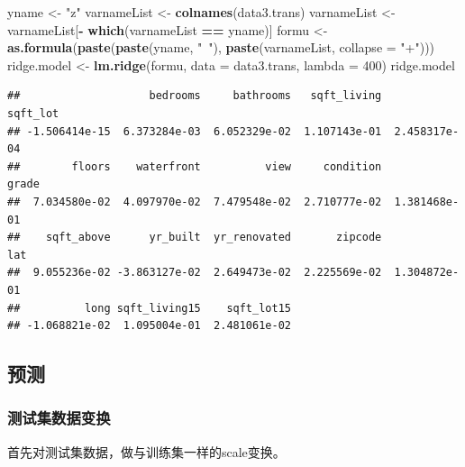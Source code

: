 \documentclass[]{article}
\newenvironment{Shaded}{\begin{snugshade}}{\end{snugshade}}
\newcommand{\KeywordTok}[1]{\textcolor[rgb]{0.13,0.29,0.53}{\textbf{#1}}}
\newcommand{\DataTypeTok}[1]{\textcolor[rgb]{0.13,0.29,0.53}{#1}}
\newcommand{\DecValTok}[1]{\textcolor[rgb]{0.00,0.00,0.81}{#1}}
\newcommand{\StringTok}[1]{\textcolor[rgb]{0.31,0.60,0.02}{#1}}
\newcommand{\OperatorTok}[1]{\textcolor[rgb]{0.81,0.36,0.00}{\textbf{#1}}}
\newcommand{\NormalTok}[1]{#1}
\begin{document}
\begin{Shaded}
\begin{Highlighting}[]
\NormalTok{yname <-}\StringTok{ "z"}
\NormalTok{varnameList <-}\StringTok{ }\KeywordTok{colnames}\NormalTok{(data3.trans)}
\NormalTok{varnameList <-}\StringTok{ }\NormalTok{varnameList[}\OperatorTok{-}\StringTok{ }\KeywordTok{which}\NormalTok{(varnameList }\OperatorTok{==}\StringTok{ }\NormalTok{yname)]}
\NormalTok{formu <-}\StringTok{ }\KeywordTok{as.formula}\NormalTok{(}\KeywordTok{paste}\NormalTok{(}\KeywordTok{paste}\NormalTok{(yname, }\StringTok{"~"}\NormalTok{), }\KeywordTok{paste}\NormalTok{(varnameList, }\DataTypeTok{collapse =} \StringTok{"+"}\NormalTok{)))}
\NormalTok{ridge.model <-}\StringTok{ }\KeywordTok{lm.ridge}\NormalTok{(formu, }\DataTypeTok{data =}\NormalTok{ data3.trans, }
                        \DataTypeTok{lambda =} \DecValTok{400}\NormalTok{)}
\NormalTok{ridge.model}
\end{Highlighting}
\end{Shaded}

\begin{verbatim}
##                    bedrooms     bathrooms   sqft_living      sqft_lot 
## -1.506414e-15  6.373284e-03  6.052329e-02  1.107143e-01  2.458317e-04 
##        floors    waterfront          view     condition         grade 
##  7.034580e-02  4.097970e-02  7.479548e-02  2.710777e-02  1.381468e-01 
##    sqft_above      yr_built  yr_renovated       zipcode           lat 
##  9.055236e-02 -3.863127e-02  2.649473e-02  2.225569e-02  1.304872e-01 
##          long sqft_living15    sqft_lot15 
## -1.068821e-02  1.095004e-01  2.481061e-02
\end{verbatim}









%
\subsection{预测}

\subsubsection{测试集数据变换}

首先对测试集数据，做与训练集一样的scale变换。
\end{document}
